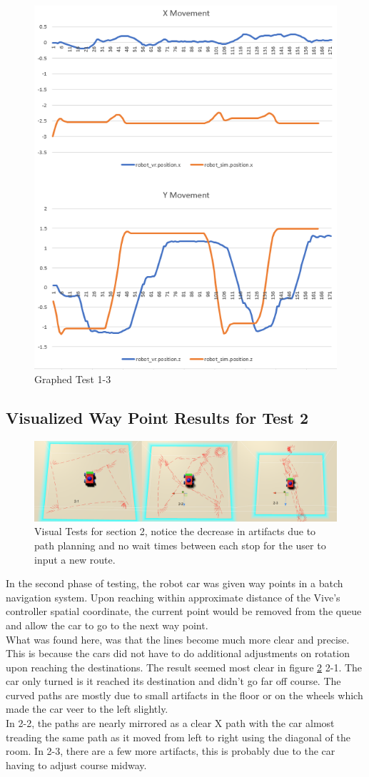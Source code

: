 \documentclass[10pt,a4paper]{article}
\begin{document}
	\begin{figure}
		\centering
		\includegraphics[width=.4\textwidth]{Test1_charts/t1_3_x_z.png}
		\caption{Graphed Test 1-3}
		\label{fig:graph_comp_t1_3}
	\end{figure}


	\subsection*{Visualized Way Point Results for Test 2}
	\begin{figure}
		\centering
		\includegraphics[width=1\textwidth]{Test2_visuals/Test2_mosaic.png}
		\caption{Visual Tests for section 2, notice the decrease in artifacts due to path planning and no wait times between each stop for the user to input a new route.}
		\label{fig:vis_comp_t2}
	\end{figure}
	In the second phase of testing, the robot car was given way points in a batch navigation system. Upon reaching within approximate distance of the Vive's controller spatial coordinate, the current point would be removed from the queue and allow the car to go to the next way point.
	\\
	What was found here, was that the lines become much more clear and precise. This is because the cars did not have to do additional adjustments on rotation upon reaching the destinations. The result seemed most clear in figure \ref{fig:vis_comp_t2} 2-1. The car only turned is it reached its destination and didn't go far off course. The curved paths are mostly due to small artifacts in the floor or on the wheels which made the car veer to the left slightly.
	\\
	In 2-2, the paths are nearly mirrored as a clear X path with the car almost treading the same path as it moved from left to right using the diagonal of the room. In 2-3, there are a few more artifacts, this is probably due to the car having to adjust course midway.
\end{document}
